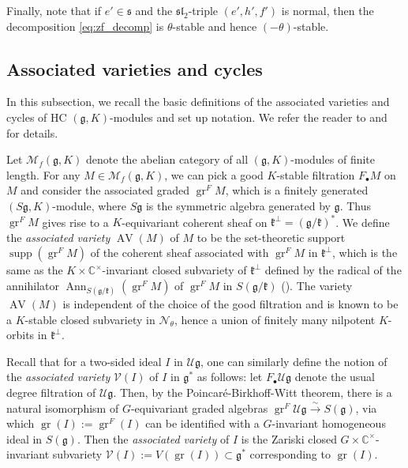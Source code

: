 \documentclass[11pt, a4paper]{amsart}
\newcommand{\C}{\mathbb{C}}
\newcommand{\g}{\mathfrak{g}}
\newcommand{\Z}{\mathbb{Z}}
\newcommand{\gr}{\operatorname{gr}}
\newcommand{\fg}{\mathfrak{g}}
\newcommand{\fk}{\mathfrak{k}}
\newcommand{\fs}{\mathfrak{s}}
\newcommand{\cF}{\mathcal{F}}
\newcommand{\cM}{\mathcal{M}}
\newcommand{\cN}{\mathcal{N}}
\newcommand{\cV}{\mathcal{V}}
\newcommand{\cU}{\mathcal{U}}
\newcommand{\Ug}{\cU\fg}
\newcommand{\MgK}{\cM_f(\g,K)}
\DeclareMathOperator{\AV}{AV}
\DeclareMathOperator{\Ann}{Ann}
\DeclareMathOperator{\supp}{supp}
\DeclareMathOperator{\Coh}{Coh}
\newcommand{\cm}{\C^\times}
\newcommand{\slf}{\mathfrak{sl}}
\theoremstyle{definition}
\numberwithin{equation}{section}
\begin{document}
Finally, note that if $e' \in \fs$ and the $\slf_2$-triple $(e',h',f')$ is normal, then the decomposition \eqref{eq:zf_decomp} is $\theta$-stable and hence $(-\theta)$-stable.



\subsection{Associated varieties and cycles} \label{subsec:AC}

In this subsection, we recall the basic definitions of the associated varieties and cycles of HC $(\g,K)$-modules and set up notation. We refer the reader to \cite{Vogan_AV} and \cite[\S\,5.2]{DMB-Hodge} for details.



Let $\MgK$ denote the abelian category of all $(\g,K)$-modules of finite length.
For any $M \in \MgK$, we can pick a good $K$-stable filtration $F_\bullet M$ on $M$ and consider the associated graded $\gr^F M$, which is a finitely generated $(S\g,K)$-module, where $S\g$ is the symmetric algebra generated by $\g$. Thus $\gr^F M$ gives rise to a $K$-equivariant coherent sheaf on $\fk^\perp = (\g/\fk)^*$. We define the \emph{associated variety} $\AV(M)$ of $M$ to be the set-theoretic support $\supp(\gr^F M)$ of the coherent sheaf associated with $\gr^F M$ in $\fk^\perp$, which is the same as the $K \times \cm$-invariant closed subvariety of $\fk^\perp$ defined by the radical of the annihilator $\Ann_{S(\g/\fk)}(\gr^F M)$ of $\gr^F M$ in $S(\g/\fk)$ (\cite[pp. 25--26]{Matsumura:comm_ring}). The variety $\AV(M)$ is independent of the choice of the good filtration and is known to be a $K$-stable closed subvariety in $\cN_\theta$, hence a union of finitely many nilpotent $K$-orbits in $\fk^\perp$. 

Recall that for a two-sided ideal $I$ in $\Ug$, one can similarly define the notion of the \emph{associated variety} $\cV(I)$ of $I$ in $\fg^*$ as follows: let $F_\bullet \Ug$ denote the usual degree filtration of $\Ug$. Then, by the Poincar\'{e}-Birkhoff-Witt theorem, there is a natural isomorphism of $G$-equivariant graded algebras $\gr^F \Ug \xrightarrow{\sim} S(\fg)$, via which $\gr(I) := \gr^F(I)$ can be identified with a $G$-invariant homogeneous ideal in $S(\fg)$. Then the \emph{associated variety} of $I$ is the Zariski closed $G \times \cm$-invariant subvariety $\cV(I) := V(\gr(I)) \subset \fg^*$ corresponding to $\gr(I)$. 
\end{document}

